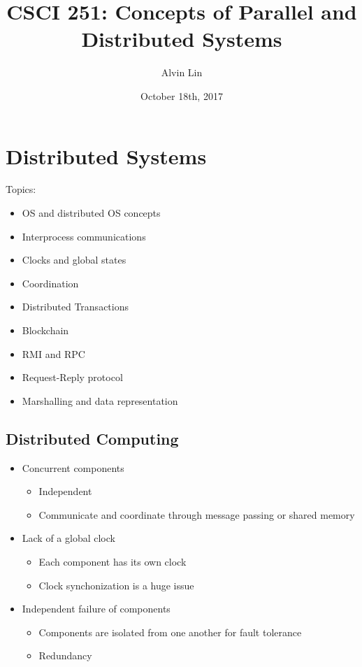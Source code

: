 \documentclass{math}
\title{CSCI 251: Concepts of Parallel and Distributed Systems}
\author{Alvin Lin}
\date{October 18th, 2017}
\begin{document}
\maketitle

\section*{Distributed Systems}
Topics:
\begin{itemize}
  \item OS and distributed OS concepts
  \item Interprocess communications
  \item Clocks and global states
  \item Coordination
  \item Distributed Transactions
  \item Blockchain
  \item RMI and RPC
  \item Request-Reply protocol
  \item Marshalling and data representation
\end{itemize}

\subsection*{Distributed Computing}
\begin{itemize}
  \item Concurrent components
  \begin{itemize}
    \item Independent
    \item Communicate and coordinate through message passing or shared memory
  \end{itemize}
  \item Lack of a global clock
  \begin{itemize}
    \item Each component has its own clock
    \item Clock synchonization is a huge issue
  \end{itemize}
  \item Independent failure of components
  \begin{itemize}
    \item Components are isolated from one another for fault tolerance
    \item Redundancy
  \end{itemize}
\end{itemize}
\end{document}
